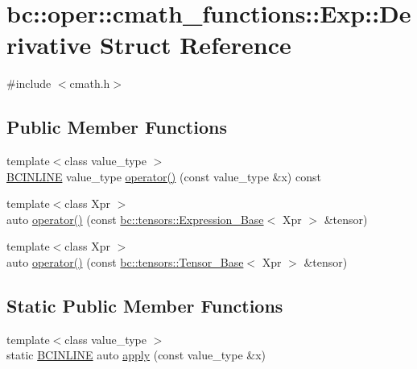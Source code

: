 \hypertarget{structbc_1_1oper_1_1cmath__functions_1_1Exp_1_1Derivative}{}\section{bc\+:\+:oper\+:\+:cmath\+\_\+functions\+:\+:Exp\+:\+:Derivative Struct Reference}
\label{structbc_1_1oper_1_1cmath__functions_1_1Exp_1_1Derivative}


{\ttfamily \#include $<$cmath.\+h$>$}

\subsection*{Public Member Functions}
\begin{DoxyCompactItemize}
\item 
{\footnotesize template$<$class value\+\_\+type $>$ }\\\hyperlink{common_8h_a6699e8b0449da5c0fafb878e59c1d4b1}{B\+C\+I\+N\+L\+I\+NE} value\+\_\+type \hyperlink{structbc_1_1oper_1_1cmath__functions_1_1Exp_1_1Derivative_ad53636fc2e9440baf0b2932f344ee96c}{operator()} (const value\+\_\+type \&x) const
\item 
{\footnotesize template$<$class Xpr $>$ }\\auto \hyperlink{structbc_1_1oper_1_1cmath__functions_1_1Exp_1_1Derivative_a44293d4d220f817edcce619f54fc7c19}{operator()} (const \hyperlink{classbc_1_1tensors_1_1Expression__Base}{bc\+::tensors\+::\+Expression\+\_\+\+Base}$<$ Xpr $>$ \&tensor)
\item 
{\footnotesize template$<$class Xpr $>$ }\\auto \hyperlink{structbc_1_1oper_1_1cmath__functions_1_1Exp_1_1Derivative_a14143c65f4bd4859e9fcce8df1617c81}{operator()} (const \hyperlink{classbc_1_1tensors_1_1Tensor__Base}{bc\+::tensors\+::\+Tensor\+\_\+\+Base}$<$ Xpr $>$ \&tensor)
\end{DoxyCompactItemize}
\subsection*{Static Public Member Functions}
\begin{DoxyCompactItemize}
\item 
{\footnotesize template$<$class value\+\_\+type $>$ }\\static \hyperlink{common_8h_a6699e8b0449da5c0fafb878e59c1d4b1}{B\+C\+I\+N\+L\+I\+NE} auto \hyperlink{structbc_1_1oper_1_1cmath__functions_1_1Exp_1_1Derivative_a3926311757bc6e42978c53557a41e021}{apply} (const value\+\_\+type \&x)
\end{DoxyCompactItemize}


